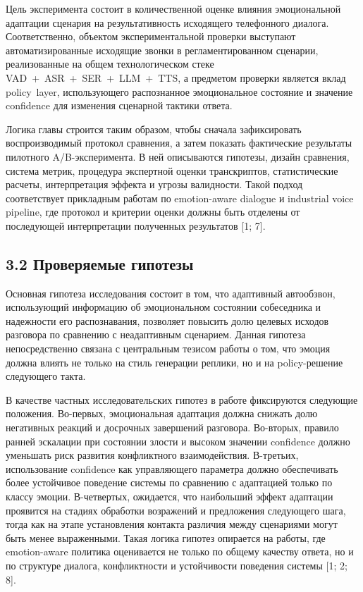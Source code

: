 \documentclass[a4paper,14pt]{extarticle}
\renewcommand{\texttt}[1]{\textnormal{#1}}
\begin{document}
Цель эксперимента состоит в количественной оценке влияния эмоциональной
адаптации сценария на результативность исходящего телефонного диалога.
Соответственно, объектом экспериментальной проверки выступают
автоматизированные исходящие звонки в регламентированном сценарии,
реализованные на общем технологическом стеке
\texttt{VAD\ +\ ASR\ +\ SER\ +\ LLM\ +\ TTS}, а предметом проверки
является вклад \texttt{policy\ layer}, использующего распознанное
эмоциональное состояние и значение \texttt{confidence} для изменения
сценарной тактики ответа.

Логика главы строится таким образом, чтобы сначала зафиксировать
воспроизводимый протокол сравнения, а затем показать фактические
результаты пилотного A/B-эксперимента. В ней описываются гипотезы,
дизайн сравнения, система метрик, процедура экспертной оценки
транскриптов, статистические расчеты, интерпретация эффекта и угрозы
валидности. Такой подход соответствует прикладным работам по
emotion-aware dialogue и industrial voice pipeline, где протокол и
критерии оценки должны быть отделены от последующей интерпретации
полученных результатов {[}1; 7{]}.

\subsection{3.2 Проверяемые
гипотезы}\label{ux43fux440ux43eux432ux435ux440ux44fux435ux43cux44bux435-ux433ux438ux43fux43eux442ux435ux437ux44b}

Основная гипотеза исследования состоит в том, что адаптивный автообзвон,
использующий информацию об эмоциональном состоянии собеседника и
надежности его распознавания, позволяет повысить долю целевых исходов
разговора по сравнению с неадаптивным сценарием. Данная гипотеза
непосредственно связана с центральным тезисом работы о том, что эмоция
должна влиять не только на стиль генерации реплики, но и на
policy-решение следующего такта.

В качестве частных исследовательских гипотез в работе фиксируются
следующие положения. Во-первых, эмоциональная адаптация должна снижать
долю негативных реакций и досрочных завершений разговора. Во-вторых,
правило ранней эскалации при состоянии злости и высоком значении
\texttt{confidence} должно уменьшать риск развития конфликтного
взаимодействия. В-третьих, использование \texttt{confidence} как
управляющего параметра должно обеспечивать более устойчивое поведение
системы по сравнению с адаптацией только по классу эмоции. В-четвертых,
ожидается, что наибольший эффект адаптации проявится на стадиях
обработки возражений и предложения следующего шага, тогда как на этапе
установления контакта различия между сценариями могут быть менее
выраженными. Такая логика гипотез опирается на работы, где emotion-aware
политика оценивается не только по общему качеству ответа, но и по
структуре диалога, конфликтности и устойчивости поведения системы {[}1;
2; 8{]}.
\end{document}
